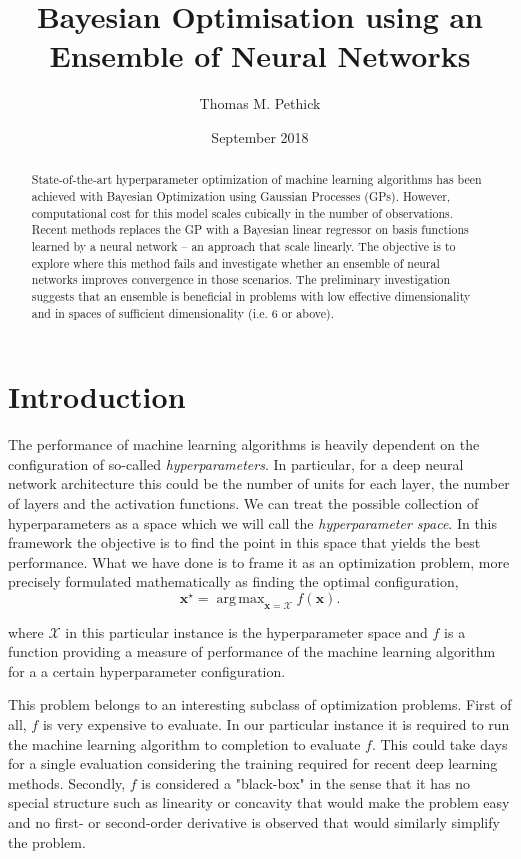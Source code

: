 \documentclass[conference,compsoc]{IEEEtran}
\title{Bayesian Optimisation using an Ensemble of Neural Networks}
\author{Thomas M. Pethick}
\date{September 2018}
\DeclareMathOperator*{\argmax}{arg\,max}
\theoremstyle{definition}
\begin{document}
\maketitle
\thispagestyle{plain} %
\pagestyle{plain}

\begin{abstract}
    State-of-the-art hyperparameter optimization of machine learning algorithms has been achieved with Bayesian Optimization using Gaussian Processes (GPs). 
    However, computational cost for this model scales cubically in the number of observations.
    Recent methods replaces the GP with a Bayesian linear regressor on basis functions learned by a neural network -- an approach that scale linearly.
    The objective is to explore where this method fails and investigate whether an ensemble of neural networks improves convergence in those scenarios.
    The preliminary investigation suggests that an ensemble is beneficial in problems with low effective dimensionality and in spaces of sufficient dimensionality (i.e. 6 or above).
\end{abstract}

\section{Introduction}

    The performance of machine learning algorithms is heavily dependent on the configuration of so-called \emph{hyperparameters}.
    In particular, for a deep neural network architecture this could be the number of units for each layer, the number of layers and the activation functions.
    We can treat the possible collection of hyperparameters as a space which we will call the \emph{hyperparameter space}.
    In this framework the objective is to find the point in this space that yields the best performance.
    What we have done is to frame it as an optimization problem, more precisely formulated mathematically as finding the optimal configuration,
        \begin{equation}
            \bm{x}^\star = \argmax_{\bm{x}=\mathcal{X}}f(\bm{x}).
        \end{equation}

    \noindent where $\mathcal{X}$ in this particular instance is the hyperparameter space and $f$ is a function providing a measure of performance of the machine learning algorithm for a a certain hyperparameter configuration.

    This problem belongs to an interesting subclass of optimization problems.
    First of all, $f$ is very expensive to evaluate.
    In our particular instance it is required to run the machine learning algorithm to completion to evaluate $f$.
    This could take days for a single evaluation considering the training required for recent deep learning methods.
    Secondly, $f$ is considered a "black-box" in the sense that it has no special structure such as linearity or concavity that would make the problem easy and no first- or second-order derivative is observed that would similarly simplify the problem.
\end{document}
